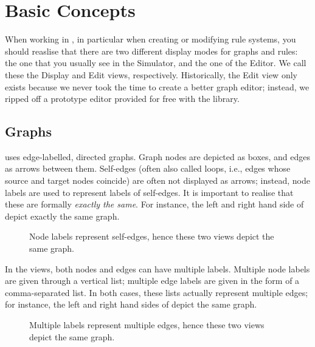\section{Basic Concepts}

When working in \Groove{}, in particular when creating or modifying rule
systems, you should reaslise that there are two different display modes for
graphs and rules: the one that you usually see in the Simulator, and the one of
the Editor. We call these the Display and Edit views, respectively.
Historically, the Edit view only exists because we never took the time to
create a better graph editor; instead, we ripped off a prototype editor
provided for free with the \JGraph{} library.

\subsection{Graphs}

\Groove{} uses edge-labelled, directed graphs. Graph nodes are depicted as
boxes, and edges as arrows between them. Self-edges (often also called loops,
i.e., edges whose source and target nodes coincide) are often not displayed as
arrows; instead, node labels are used to represent labels of self-edges. It is
important to realise that these are formally \emph{exactly the same}. For
instance, the left and right hand side of  depict exactly the
same graph.

\begin{figure}[h]
\begin{center}
\qquad
{}
\end{center}
\caption{Node labels represent self-edges, hence these two views depict the
same graph.}
\end{figure}

In the \Groove{} views, both nodes and edges can have multiple labels. Multiple
node labels are given through a vertical list; multiple edge labels are given
in the form of a comma-separated list. In both cases, these lists actually
represent multiple edges; for instance, the left and right hand sides of
 depict the same graph.

\begin{figure}[h]
\begin{center}
\qquad
{}
\end{center}
\caption{Multiple labels represent multiple edges, hence these two views depict
the same graph.}
\end{figure}


